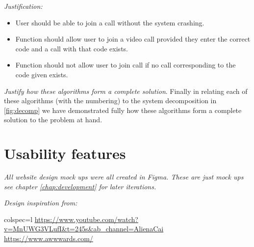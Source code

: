 \textit{Justification: } \\

\begin{itemize}

\item User should be able to join a call without the system crashing.

\item{Function should allow user to join a video call provided they
	enter the correct code and a call with that code exists.}

\item Function should not allow user to join call if no call corresponding to the code given exists.

\end{itemize}

\vspace{0.2cm}

\textit{Justify how these algorithms form a complete solution}.
Finally in relating each of these algorithms (with the 
numbering) to the system decomposition in \ref{fig:decomp}
we have demonstrated fully how these algorithms form a 
complete solution to the problem at hand.


\section{Usability features}
\label{sec:usability}

\textit{All website design mock ups were all created in
Figma. These are just mock ups see chapter \ref{chap:development}
for later iterations.}\\ \vspace{0.1cm}

\textit{Design inspiration from:}\\

\begin{tblr}{colspec={l}}
  \url{https://www.youtube.com/watch?v=MnUWG3VLufI&t=245s&ab_channel=AlienaCai}\\
  \url{https://www.awwwards.com/}\\
\end{tblr}

